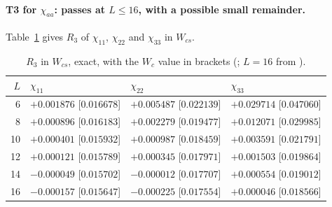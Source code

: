 \paragraph{T3 for $\chi_{aa}$: passes at $L\le16$, with a possible small remainder.} Table~\ref{d2:tab:wcsr3} gives $R_3$ of
$\chi_{11}$, $\chi_{22}$ and $\chi_{33}$ in $W_{cs}$.

\begin{table}[ht]
\centering\footnotesize\renewcommand{\arraystretch}{1.15}
\begin{tabular}{@{}rlll@{}}
\toprule
$L$ & $\chi_{11}$ & $\chi_{22}$ & $\chi_{33}$ \\\midrule
6 & $+0.001876$ [$0.016678$] & $+0.005487$ [$0.022139$] & $+0.029714$ [$0.047060$] \\
8 & $+0.000896$ [$0.016183$] & $+0.002279$ [$0.019477$] & $+0.012071$ [$0.029985$] \\
10 & $+0.000401$ [$0.015932$] & $+0.000987$ [$0.018459$] & $+0.003591$ [$0.021791$] \\
12 & $+0.000121$ [$0.015789$] & $+0.000345$ [$0.017971$] & $+0.001503$ [$0.019864$] \\
14 & $-0.000049$ [$0.015702$] & $-0.000012$ [$0.017707$] & $+0.000554$ [$0.019012$] \\
16 & $-0.000157$ [$0.015647$] & $-0.000225$ [$0.017554$] & $+0.000046$ [$0.018566$] \\
\bottomrule
\end{tabular}
\caption{$R_3$ in $W_{cs}$, exact, with the $W_c$ value in brackets (;
$L=16$ from ).}
\label{d2:tab:wcsr3}
\end{table}

